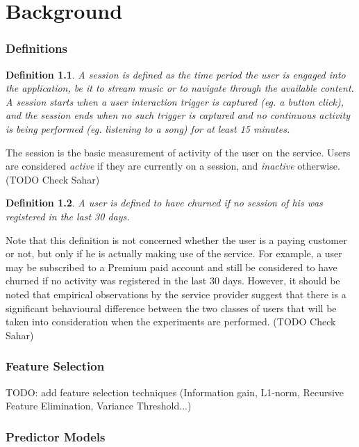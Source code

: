 \documentclass{kththesis}
\begin{document}
\chapter{Background}

\subsection{Definitions}

\newtheorem{definition}{Definition}

\begin{definition}
A \emph{session} is defined as the time period the user is engaged into the application, be it to stream music or to navigate through the available content. A session starts when a user interaction trigger is captured (eg. a button click), and the session ends when no such trigger is captured and no continuous activity is being performed (eg. listening to a song) for at least 15 minutes.
\end{definition}

The session is the basic measurement of activity of the user on the service. Users are considered \emph{active} if they are currently on a session, and \emph{inactive} otherwise. (TODO Check Sahar)

\begin{definition}
A user is defined to have \emph{churned} if no session of his was registered in the last 30 days.
\end{definition}

Note that this definition is not concerned whether the user is a paying customer or not, but only if he is actually making use of the service. For example, a user may be subscribed to a Premium paid account and still be considered to have churned if no activity was registered in the last 30 days. However, it should be noted that empirical observations by the service provider suggest that there is a significant behavioural difference between the two classes of users that will be taken into consideration when the experiments are performed. (TODO Check Sahar)

\subsection{Feature Selection}

TODO: add feature selection techniques (Information gain, L1-norm, Recursive Feature Elimination, Variance Threshold...)

\subsection{Predictor Models}
\end{document}
